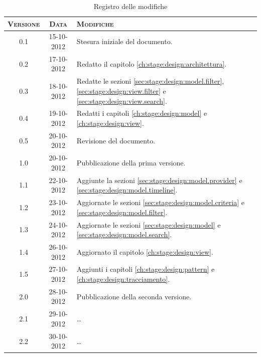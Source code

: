 \documentclass[10pt,a4paper,headinclude,footinclude,hidelinks]{scrreprt} %
\begin{document}
    \title{\rmfamily\normalfont{}}
    \author{}
    \date{\today}
    
    \maketitle
    
    \begin{abstract}
        \noindent Il documento riporta le informazioni di progettazione riguardanti l'interfaccia grafica per la visualizzazione e la navigazione dei contenuti.
    \end{abstract}
    
	\begin{table}[ht]
	\centering
	\begin{tabular}{|c|c|l|}
	\hline
	\textsc{Versione} & \textsc{Data} & \textsc{Modifiche} \\ \hline
	0.1 & 15-10-2012 & Stesura iniziale del documento. \\ \hline
	0.2 & 17-10-2012 & Redatto il capitolo \ref{ch:stage:design:architettura}. \\ \hline
	0.3 & 18-10-2012 & Redatte le sezioni \ref{sec:stage:design:model.filter}, \ref{sec:stage:design:view.filter} e \ref{sec:stage:design:view.search}. \\ \hline
	0.4 & 19-10-2012 & Redatti i capitoli \ref{ch:stage:design:model} e \ref{ch:stage:design:view}. \\ \hline
	0.5 & 20-10-2012 & Revisione del documento. \\ \hline
	1.0 & 20-10-2012 & Pubblicazione della prima versione. \\ \hline
	1.1 & 22-10-2012 & Aggiunte la sezioni \ref{sec:stage:design:model.provider} e \ref{sec:stage:design:model.timeline}. \\ \hline
	1.2 & 23-10-2012 & Aggiornate le sezioni \ref{sec:stage:design:model.criteria} e \ref{sec:stage:design:model.filter}. \\ \hline
	1.3 & 24-10-2012 & Aggiornate le sezioni \ref{sec:stage:design:model} e \ref{sec:stage:design:model.search}. \\ \hline
	1.4 & 26-10-2012 & Aggiornato il capitolo \ref{ch:stage:design:view}. \\ \hline
	1.5 & 27-10-2012 & Aggiunti i capitoli \ref{ch:stage:design:pattern} e \ref{ch:stage:design:tracciamento}. \\ \hline
	2.0 & 28-10-2012 & Pubblicazione della seconda versione. \\ \hline
	2.1 & 29-10-2012 & \ldots \\ \hline
	2.2 & 30-10-2012 & \ldots \\ \hline
	\end{tabular}
	\caption{Registro delle modifiche}
	\label{tab:stage:wp:workload}
	\end{table}
\end{document}
